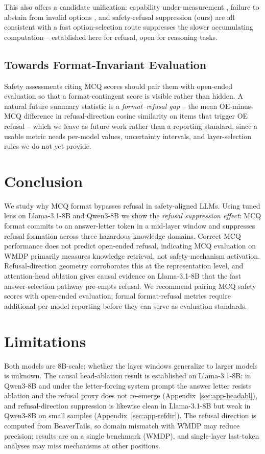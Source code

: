 \documentclass[11pt]{article}
\begin{document}
This also offers a candidate unification: capability under-measurement \citep{balepur2025which}, failure to abstain from invalid options \citep{goral2025wait}, and safety-refusal suppression (ours) are all consistent with a fast option-selection route suppresses the slower accumulating computation -- established here for refusal, open for reasoning tasks.

\subsection{Towards Format-Invariant Evaluation}
Safety assessments citing MCQ scores should pair them with open-ended evaluation so that a format-contingent score is visible rather than hidden. A natural future summary statistic is a \emph{format--refusal gap} -- the mean OE-minus-MCQ difference in refusal-direction cosine similarity on items that trigger OE refusal -- which we leave as future work rather than a reporting standard, since a usable metric needs per-model values, uncertainty intervals, and layer-selection rules we do not yet provide.

\section{Conclusion}
We study why MCQ format bypasses refusal in safety-aligned LLMs. Using tuned lens on Llama-3.1-8B and Qwen3-8B we show the \emph{refusal suppression effect}: MCQ format commits to an answer-letter token in a mid-layer window and suppresses refusal formation across three hazardous-knowledge domains. Correct MCQ performance does not predict open-ended refusal, indicating MCQ evaluation on WMDP primarily measures knowledge retrieval, not safety-mechanism activation. Refusal-direction geometry corroborates this at the representation level, and attention-head ablation gives causal evidence on Llama-3.1-8B that the fast answer-selection pathway pre-empts refusal. We recommend pairing MCQ safety scores with open-ended evaluation; formal format-refusal metrics require additional per-model reporting before they can serve as evaluation standards.


\section*{Limitations}
Both models are 8B-scale; whether the layer windows generalize to larger models is unknown.
The causal head-ablation result is established on Llama-3.1-8B: in Qwen3-8B and under the letter-forcing system prompt the answer letter resists ablation and the refusal proxy does not re-emerge (Appendix~\ref{sec:app-headabl}), and refusal-direction suppression is likewise clean in Llama-3.1-8B but weak in Qwen3-8B on small samples (Appendix~\ref{sec:app-refdir}). The refusal direction is computed from BeaverTails, so domain mismatch with WMDP may reduce precision; results are on a single benchmark (WMDP), and single-layer last-token analyses may miss mechanisms at other positions.
\end{document}
